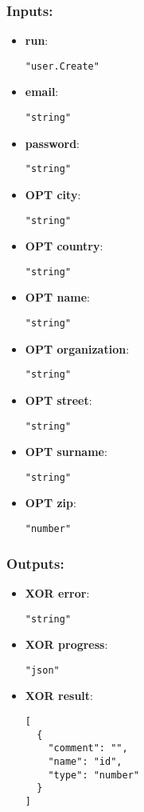 \subsubsection*{Inputs:}
\begin{itemize}
    \item \textbf{run}: 
\begin{lstlisting}
"user.Create"
\end{lstlisting}
    \item \textbf{email}: 
\begin{lstlisting}
"string"
\end{lstlisting}
    \item \textbf{password}: 
\begin{lstlisting}
"string"
\end{lstlisting}
    \item \textbf{OPT city}: 
\begin{lstlisting}
"string"
\end{lstlisting}
    \item \textbf{OPT country}: 
\begin{lstlisting}
"string"
\end{lstlisting}
    \item \textbf{OPT name}: 
\begin{lstlisting}
"string"
\end{lstlisting}
    \item \textbf{OPT organization}: 
\begin{lstlisting}
"string"
\end{lstlisting}
    \item \textbf{OPT street}: 
\begin{lstlisting}
"string"
\end{lstlisting}
    \item \textbf{OPT surname}: 
\begin{lstlisting}
"string"
\end{lstlisting}
    \item \textbf{OPT zip}: 
\begin{lstlisting}
"number"
\end{lstlisting}
  \end{itemize}

\subsubsection*{Outputs:}
\begin{itemize}
    \item \textbf{XOR error}: 
\begin{lstlisting}
"string"
\end{lstlisting}
    \item \textbf{XOR progress}: 
\begin{lstlisting}
"json"
\end{lstlisting}
    \item \textbf{XOR result}: 
\begin{lstlisting}
[
  {
    "comment": "", 
    "name": "id", 
    "type": "number"
  }
]
\end{lstlisting}
  \end{itemize}

